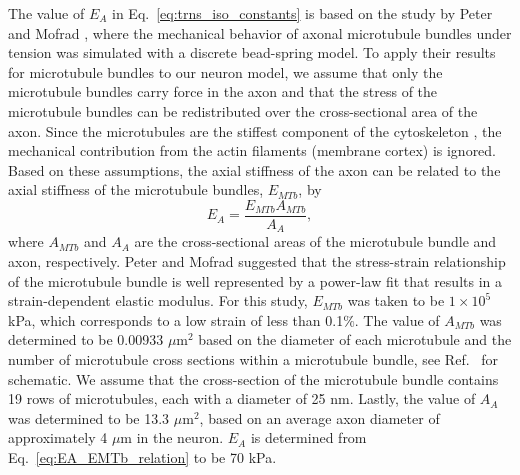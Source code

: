 \documentclass[]{interact}
\begin{document}
The value of $E_A$ in Eq.\ \eqref{eq:trns_iso_constants} is based on the study by Peter and Mofrad \citep{Peter:2012fc}, where the mechanical behavior of axonal microtubule bundles under tension was simulated with a discrete bead-spring model. To apply their results for microtubule bundles to our neuron model, we assume that only the microtubule bundles carry force in the axon and that the stress of the microtubule bundles can be redistributed over the cross-sectional area of the axon. Since the microtubules are the stiffest component of the cytoskeleton \citep{Fletcher:2010ku}, the mechanical contribution from the actin filaments (membrane cortex) is ignored. Based on these assumptions, the axial stiffness of the axon can be related to the axial stiffness of the microtubule bundles, $E_{MTb}$, by
%
\begin{equation}
E_A = \frac{E_{MTb} A_{MTb}}{A_A},
\label{eq:EA_EMTb_relation}
\end{equation}
%
where $A_{MTb}$ and $A_A$ are the cross-sectional areas of the microtubule bundle and axon, respectively. Peter and Mofrad \citep{Peter:2012fc} suggested that the stress-strain relationship of the microtubule bundle is well represented by a power-law fit that results in a strain-dependent elastic modulus. For this study, $E_{MTb}$ was taken to be $1\times 10^5$ kPa, which corresponds to a low strain of less than 0.1$\%$. The value of $A_{MTb}$ was determined to be 0.00933 $\mu$m${}^2$ based on the diameter of each microtubule and the number of microtubule cross sections within a microtubule bundle, see Ref.\ \citep{Peter:2012fc} for schematic. We assume that the cross-section of the microtubule bundle contains 19 rows of microtubules, each with a diameter of 25 nm. Lastly, the value of $A_A$ was determined to be 13.3 $\mu$m${}^2$, based on an average axon diameter of approximately 4 $\mu$m in the neuron. $E_A$ is determined from Eq.\ \eqref{eq:EA_EMTb_relation} to be 70 kPa. 
\end{document}
